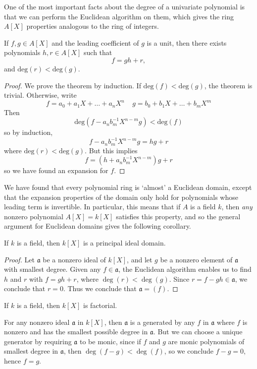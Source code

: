 One of the most important facts about the degree of a univariate polynomial is that we can perform the Euclidean algorithm on them, which gives the ring $A[X]$ properties analogous to the ring of integers.

\begin{theorem}
    If $f,g \in A[X]$ and the leading coefficient of $g$ is a unit, then there exists polynomials $h,r \in A[X]$ such that
    \[ f = gh + r, \]
    and $\text{deg}(r) < \text{deg}(g)$.
\end{theorem}
\begin{proof}
    We prove the theorem by induction. If $\text{deg}(f) < \text{deg}(g)$, the theorem is trivial. Otherwise, write
    \[ f = a_0 + a_1 X + \dots + a_n X^n\ \ \ \ \ g = b_0 + b_1 X + \dots + b_m X^m \]
    Then
    \[ \text{deg}(f - a_n b_m^{-1} X^{n - m} g) < \text{deg}(f) \]
    so by induction,
    \[ f - a_n b_m^{-1} X^{n-m} g = hg + r \]
    where $\text{deg}(r) < \text{deg}(g)$. But this implies
    \[ f = (h + a_n b_m^{-1} X^{n-m}) g + r \]
    so we have found an expansion for $f$.
\end{proof}

We have found that every polynomial ring is `almost' a Euclidean domain, except that the expansion properties of the domain only hold for polynomials whose leading term is invertible. In particular, this means that if $A$ is a field $k$, then {\it any} nonzero polynomial $A[X] = k[X]$ satisfies this property, and so the general argument for Euclidean domains gives the following corollary.

\begin{corollary}
    If $k$ is a field, then $k[X]$ is a principal ideal domain.
\end{corollary}
\begin{proof}
    Let $\mathfrak{a}$ be a nonzero ideal of $k[X]$, and let $g$ be a nonzero element of $\mathfrak{a}$ with smallest degree. Given any $f \in \mathfrak{a}$, the Euclidean algorithm enables us to find $h$ and $r$ with $f = gh + r$, where $\deg(r) < \deg(g)$. Since $r = f - gh \in \mathfrak{a}$, we conclude that $r = 0$. Thus we conclude that $\mathfrak{a} = (f)$.
\end{proof}

\begin{corollary}
    If $k$ is a field, then $k[X]$ is factorial.
\end{corollary}

\begin{remark}
    For any nonzero ideal $\mathfrak{a}$ in $k[X]$, then $\mathfrak{a}$ is a generated by any $f$ in $\mathfrak{a}$ where $f$ is nonzero and has the smallest possible degree in $\mathfrak{a}$. But we can choose a unique generator by requiring $\mathfrak{a}$ to be monic, since if $f$ and $g$ are monic polynomials of smallest degree in $\mathfrak{a}$, then $\deg(f - g) < \deg(f)$, so we conclude $f - g = 0$, hence $f = g$.
\end{remark}

